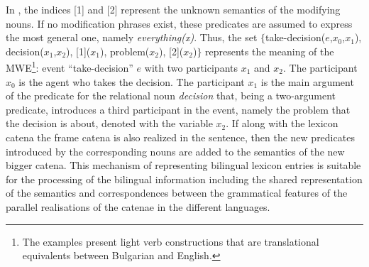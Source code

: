\documentclass[output=paper]{langsci/langscibook}
\begin{document}
In , the indices [1] and [2] represent the unknown semantics of the modifying nouns. If no modification phrases exist, these predicates are assumed to express the most general one, namely {\em everything(x)}. Thus, the set $\{$take-\linebreak decision($e$,$x_0$,$x_1$), decision($x_1$,$x_2$), [1]($x_1$), problem($x_2$), [2]($x_2$)$\}$ represents the \linebreak meaning of the  MWE\footnote{The examples present light verb constructions that are translational equivalents between Bulgarian and English.}: event ``take-decision'' $e$ with two participants $x_1$ and $x_2$. The participant $x_0$ is the agent who takes the decision. The participant $x_1$ is the main argument of the predicate for the relational noun \textit{decision} that, being a two-argument predicate, introduces a third participant in the event, namely the problem that the decision is about, denoted with the variable $x_2$. If along with the lexicon catena the frame catena is also realized in the sentence, then the new predicates introduced by the corresponding nouns are added to the semantics of the new bigger catena. This mechanism of representing bilingual lexicon entries is suitable for the processing of the bilingual information including the shared representation of the semantics and correspondences between the grammatical features of the parallel realisations of the catenae in the different languages.
\end{document}
